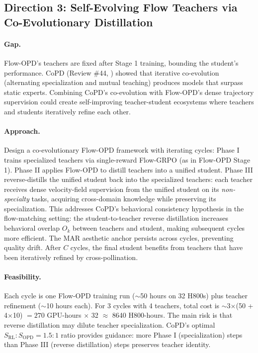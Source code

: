 \documentclass[11pt]{article}
\begin{document}
\subsection{Direction 3: Self-Evolving Flow Teachers via Co-Evolutionary Distillation}

\paragraph{Gap.}
Flow-OPD's teachers are fixed after Stage 1 training, bounding the student's performance. CoPD (Review \#44, \cite{copd}) showed that iterative co-evolution (alternating specialization and mutual teaching) produces models that surpass static experts. Combining CoPD's co-evolution with Flow-OPD's dense trajectory supervision could create self-improving teacher-student ecosystems where teachers and students iteratively refine each other.

\paragraph{Approach.}
Design a co-evolutionary Flow-OPD framework with iterating cycles: Phase I trains specialized teachers via single-reward Flow-GRPO (as in Flow-OPD Stage 1). Phase II applies Flow-OPD to distill teachers into a unified student. Phase III reverse-distills the unified student back into the specialized teachers: each teacher receives dense velocity-field supervision from the unified student on its \emph{non-specialty} tasks, acquiring cross-domain knowledge while preserving its specialization. This addresses CoPD's behavioral consistency hypothesis in the flow-matching setting: the student-to-teacher reverse distillation increases behavioral overlap $O_k$ between teachers and student, making subsequent cycles more efficient. The MAR aesthetic anchor persists across cycles, preventing quality drift. After $C$ cycles, the final student benefits from teachers that have been iteratively refined by cross-pollination.

\paragraph{Feasibility.}
Each cycle is one Flow-OPD training run ($\sim$50 hours on 32 H800s) plus teacher refinement ($\sim$10 hours each). For 3 cycles with 4 teachers, total cost is $\sim$3$\times$(50 + 4$\times$10) $= 270$ GPU-hours $\times$ 32 $\approx$ 8640 H800-hours. The main risk is that reverse distillation may dilute teacher specialization. CoPD's optimal $S_{\mathrm{RL}}:S_{\mathrm{OPD}} = 1.5:1$ ratio provides guidance: more Phase I (specialization) steps than Phase III (reverse distillation) steps preserves teacher identity.
\end{document}
